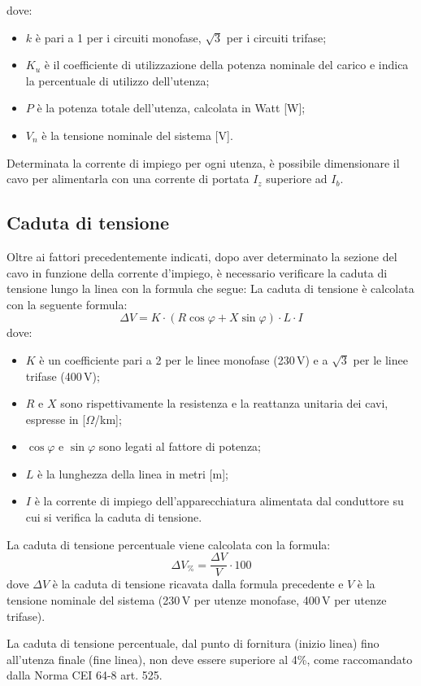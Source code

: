 dove:
\begin{itemize}
\item $k$ è pari a 1 per i circuiti monofase, $\sqrt{3}$ per i circuiti trifase;
\item $K_u$ è il coefficiente di utilizzazione della potenza nominale del carico e indica la percentuale di utilizzo dell'utenza;
\item $P$ è la potenza totale dell'utenza, calcolata in Watt [W];
\item $V_n$ è la tensione nominale del sistema [V].
\end{itemize}

Determinata la corrente di impiego per ogni utenza, è possibile dimensionare il cavo per alimentarla con una corrente di portata $I_z$ superiore ad $I_b$.

\subsection{Caduta di tensione}
Oltre ai fattori precedentemente indicati, dopo aver determinato la sezione del cavo in funzione della corrente d’impiego, è necessario verificare la caduta di tensione lungo la linea con la formula che segue:
La caduta di tensione è calcolata con la seguente formula:
\[
\Delta V = K \cdot (R \cos\varphi + X \sin\varphi) \cdot L \cdot I
\]
dove:
\begin{itemize}
\item $K$ è un coefficiente pari a 2 per le linee monofase (230\,V) e a $\sqrt{3}$ per le linee trifase (400\,V);
\item $R$ e $X$ sono rispettivamente la resistenza e la reattanza unitaria dei cavi, espresse in [$\Omega$/km];
\item $\cos\varphi$ e $\sin\varphi$ sono legati al fattore di potenza;
\item $L$ è la lunghezza della linea in metri [m];
\item $I$ è la corrente di impiego dell'apparecchiatura alimentata dal conduttore su cui si verifica la caduta di tensione.
\end{itemize}

La caduta di tensione percentuale viene calcolata con la formula:
\[
\Delta V_{\%} = \frac{\Delta V}{V} \cdot 100
\]
dove $\Delta V$ è la caduta di tensione ricavata dalla formula precedente e $V$ è la tensione nominale del sistema (230\,V per utenze monofase, 400\,V per utenze trifase).

La caduta di tensione percentuale, dal punto di fornitura (inizio linea) fino all'utenza finale (fine linea), non deve essere superiore al 4\%, come raccomandato dalla Norma CEI 64-8 art. 525.

